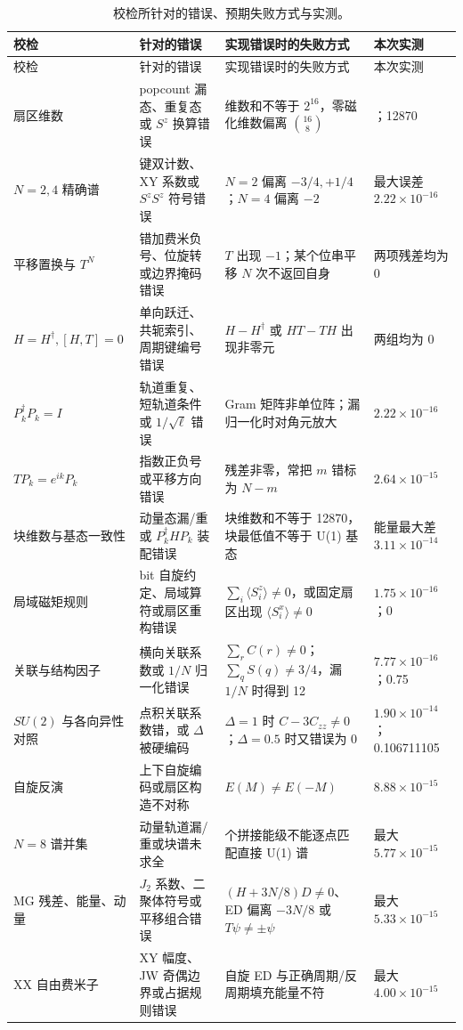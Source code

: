 \documentclass[11pt,a4paper]{ctexart}
\begin{document}
{\scriptsize
\begin{longtable}{>{\raggedright\arraybackslash}p{2.2cm}>{\raggedright\arraybackslash}p{4.1cm}>{\raggedright\arraybackslash}p{5.2cm}>{\raggedright\arraybackslash}p{2.6cm}}
\caption{校检所针对的错误、预期失败方式与实测。}\label{tab:validation-intent}\\
\toprule
校检 & 针对的错误 & 实现错误时的失败方式 & 本次实测\\
\midrule
\endfirsthead
\toprule
校检 & 针对的错误 & 实现错误时的失败方式 & 本次实测\\
\midrule
\endhead
扇区维数 & popcount 漏态、重复态或 $S^z$ 换算错误 & 维数和不等于 $2^{16}$，零磁化维数偏离 $\binom{16}{8}$ & 65536；12870\\
$N=2,4$ 精确谱 & 键双计数、XY 系数或 $S^zS^z$ 符号错误 & $N=2$ 偏离 $-3/4,+1/4$；$N=4$ 偏离 $-2$ & 最大误差 $2.22\times10^{-16}$\\
平移置换与 $T^N$ & 错加费米负号、位旋转或边界掩码错误 & $T$ 出现 $-1$；某个位串平移 $N$ 次不返回自身 & 两项残差均为 0\\
$H=H^\dagger,[H,T]=0$ & 单向跃迁、共轭索引、周期键编号错误 & $H-H^\dagger$ 或 $HT-TH$ 出现非零元 & 两组均为 0\\
$P_k^\dagger P_k=I$ & 轨道重复、短轨道条件或 $1/\sqrt\ell$ 错误 & Gram 矩阵非单位阵；漏归一化时对角元放大 & $2.22\times10^{-16}$\\
$TP_k=e^{ik}P_k$ & 指数正负号或平移方向错误 & 残差非零，常把 $m$ 错标为 $N-m$ & $2.64\times10^{-15}$\\
块维数与基态一致性 & 动量态漏/重或 $P_k^\dagger HP_k$ 装配错误 & 块维数和不等于 12870，块最低值不等于 U(1) 基态 & 能量最大差 $3.11\times10^{-14}$\\
局域磁矩规则 & bit 自旋约定、局域算符或扇区重构错误 & $\sum_i\langle S_i^z\rangle\ne0$，或固定扇区出现 $\langle S_i^x\rangle\ne0$ & $1.75\times10^{-16}$；0\\
关联与结构因子 & 横向关联系数或 $1/N$ 归一化错误 & $\sum_rC(r)\ne0$；$\sum_qS(q)\ne3/4$，漏 $1/N$ 时得到 12 & $7.77\times10^{-16}$；0.75\\
$SU(2)$ 与各向异性对照 & 点积关联系数错，或 $\Delta$ 被硬编码 & $\Delta=1$ 时 $C-3C_{zz}\ne0$；$\Delta=0.5$ 时又错误为 0 & $1.90\times10^{-14}$；0.106711105\\
自旋反演 & 上下自旋编码或扇区构造不对称 & $E(M)\ne E(-M)$ & $8.88\times10^{-15}$\\
$N=8$ 谱并集 & 动量轨道漏/重或块谱未求全 & 70 个拼接能级不能逐点匹配直接 U(1) 谱 & 最大 $5.77\times10^{-15}$\\
MG 残差、能量、动量 & $J_2$ 系数、二聚体符号或平移组合错误 & $(H+3N/8)D\ne0$、ED 偏离 $-3N/8$ 或 $T\psi\ne\pm\psi$ & 最大 $5.33\times10^{-15}$\\
XX 自由费米子 & XY 幅度、JW 奇偶边界或占据规则错误 & 自旋 ED 与正确周期/反周期填充能量不符 & 最大 $4.00\times10^{-15}$\\
\bottomrule
\end{longtable}
}
\end{document}
